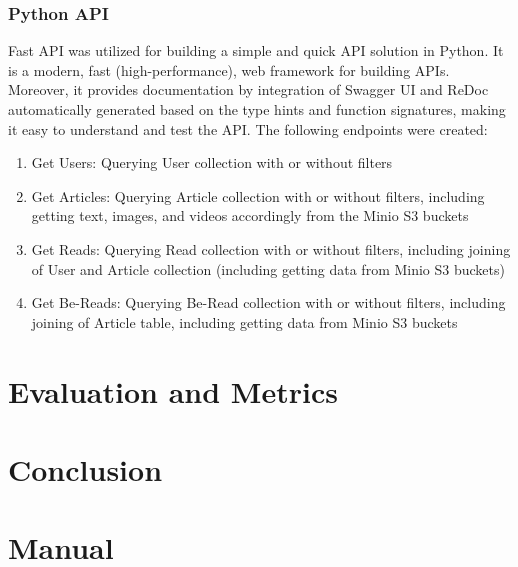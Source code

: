 \documentclass{article}
\begin{document}
    \subsubsection{Python API}
    Fast API was utilized for building a simple and quick API solution in Python. It is a modern, fast (high-performance), web framework for building APIs. Moreover, it provides documentation by integration of Swagger UI and ReDoc automatically generated based on the type hints and function signatures, making it easy to understand and test the API.
    The following endpoints were created:
    \begin{enumerate}
        \item Get Users: Querying User collection with or without filters
        \item Get Articles: Querying Article collection with or without filters, including getting text, images, and videos accordingly from the Minio S3 buckets
        \item Get Reads: Querying Read collection with or without filters, including joining of User and Article collection (including getting data from Minio S3 buckets)
        \item Get Be-Reads: Querying Be-Read collection with or without filters, including joining of Article table, including getting data from Minio S3 buckets
    \end{enumerate}

    \section{Evaluation and Metrics}

    \section{Conclusion}
    
    \section{Manual}
\end{document}
